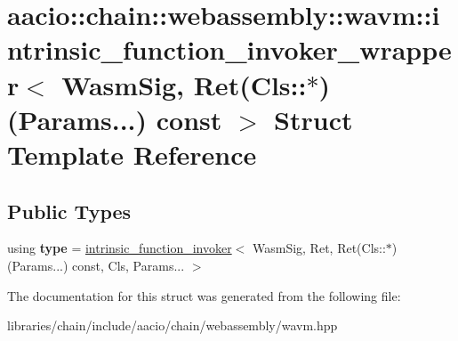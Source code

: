 \hypertarget{structaacio_1_1chain_1_1webassembly_1_1wavm_1_1intrinsic__function__invoker__wrapper_3_01_wasm_s05e49a7cdf4f2acc0751761a01d1f4dd}{}\section{aacio\+:\+:chain\+:\+:webassembly\+:\+:wavm\+:\+:intrinsic\+\_\+function\+\_\+invoker\+\_\+wrapper$<$ Wasm\+Sig, Ret(Cls\+:\+:$\ast$)(Params...) const $>$ Struct Template Reference}
\label{structaacio_1_1chain_1_1webassembly_1_1wavm_1_1intrinsic__function__invoker__wrapper_3_01_wasm_s05e49a7cdf4f2acc0751761a01d1f4dd}
\subsection*{Public Types}
\begin{DoxyCompactItemize}
\item 
\mbox{\label{structaacio_1_1chain_1_1webassembly_1_1wavm_1_1intrinsic__function__invoker__wrapper_3_01_wasm_s05e49a7cdf4f2acc0751761a01d1f4dd_a7d109df6dfef0105e4abb9d5bd4ee70b}} 
using {\bfseries type} = \mbox{\hyperlink{structaacio_1_1chain_1_1webassembly_1_1wavm_1_1intrinsic__function__invoker}{intrinsic\+\_\+function\+\_\+invoker}}$<$ Wasm\+Sig, Ret, Ret(Cls\+::$\ast$)(Params...) const, Cls, Params... $>$
\end{DoxyCompactItemize}


The documentation for this struct was generated from the following file\+:\begin{DoxyCompactItemize}
\item 
libraries/chain/include/aacio/chain/webassembly/wavm.\+hpp\end{DoxyCompactItemize}
